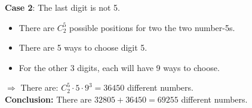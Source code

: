 \documentclass[10pt]{article}
\begin{document}
\begin{enumerate}
        \textbf{Case 2}: The last digit is not 5.
        \begin{itemize}
            \item There are $C_{2}^{5}$ possible positions for two the two number-5s.
            \item There are 5 ways to choose digit 5.
            \item For the other 3 digits, each will have 9 ways to choose.
        \end{itemize}
        $\Rightarrow$ There are: $C_{2}^{5} \cdot 5 \cdot 9^{3} = 36450$ different numbers. \\
        \textbf{Conclusion:} There are $32805 + 36450 = 69255$ different numbers.
\end{enumerate}
\end{document}
